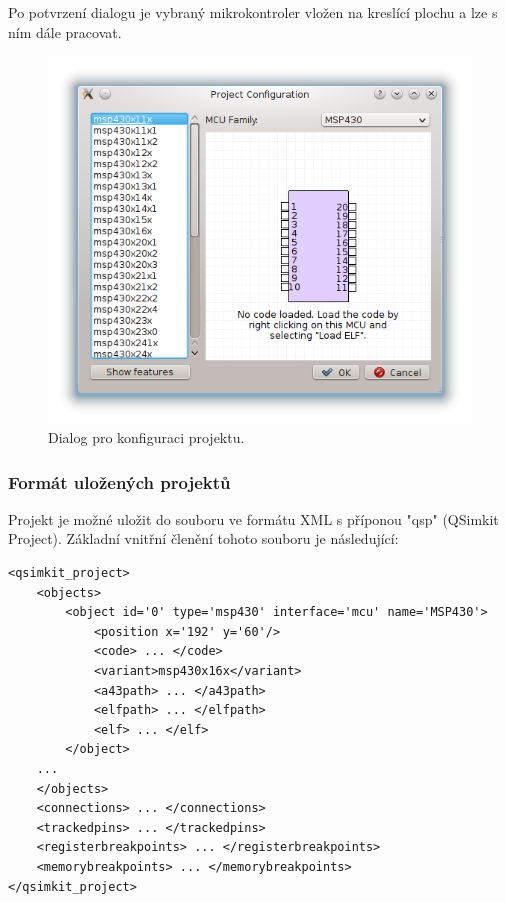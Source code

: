 Po potvrzení dialogu je vybraný mikrokontroler vložen na kreslící plochu a lze s ním dále pracovat.

\begin{figure}[ht]
\centering
\includegraphics[trim=0cm 0cm 0cm 0cm, scale=0.7]{fig/projectconf}
\caption{Dialog pro konfiguraci projektu.}
\label{fig:projectconf}
\end{figure}

\subsubsection{Formát uložených projektů}

Projekt je možné uložit do souboru ve formátu XML s příponou "qsp" (QSimkit Project). Základní vnitřní členění tohoto souboru je následující:

\lstset{language=XML, numbers=left, frame=single, breaklines=true, tabsize=2, xleftmargin=20pt}
\begin{lstlisting}
<qsimkit_project>
	<objects>
		<object id='0' type='msp430' interface='mcu' name='MSP430'>
			<position x='192' y='60'/>
			<code> ... </code>
			<variant>msp430x16x</variant>
			<a43path> ... </a43path>
			<elfpath> ... </elfpath>
			<elf> ... </elf>
		</object>
	...
	</objects>
	<connections> ... </connections>
	<trackedpins> ... </trackedpins>
	<registerbreakpoints> ... </registerbreakpoints>
	<memorybreakpoints> ... </memorybreakpoints>
</qsimkit_project>
\end{lstlisting}

